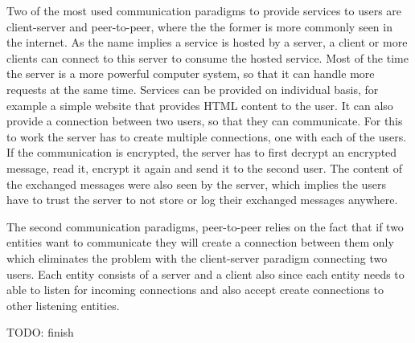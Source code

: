 Two of the most used communication paradigms to provide services to users are client-server and peer-to-peer, where the the former is more commonly seen in the internet. As the name implies a service is hosted by a server, a client or more clients can connect to this server to consume the hosted service. Most of the time the server is a more powerful computer system, so that it can handle more requests at the same time. Services can be provided on individual basis, for example a simple website that provides HTML content to the user. It can also provide a connection between two users, so that they can communicate. For this to work the server has to create multiple connections, one with each of the users. If the communication is encrypted, the server has to first decrypt an encrypted message, read it, encrypt it again and send it to the second user. The content of the exchanged messages were also seen by the server, which implies the users have to trust the server to not store or log their exchanged messages anywhere.

The second communication paradigms, peer-to-peer relies on the fact that if two entities want to communicate they will create a connection between them only which eliminates the problem with the client-server paradigm connecting two users. Each entity consists of a server and a client also since each entity needs to able to listen for incoming connections and also accept create connections to other listening entities. 

TODO: finish